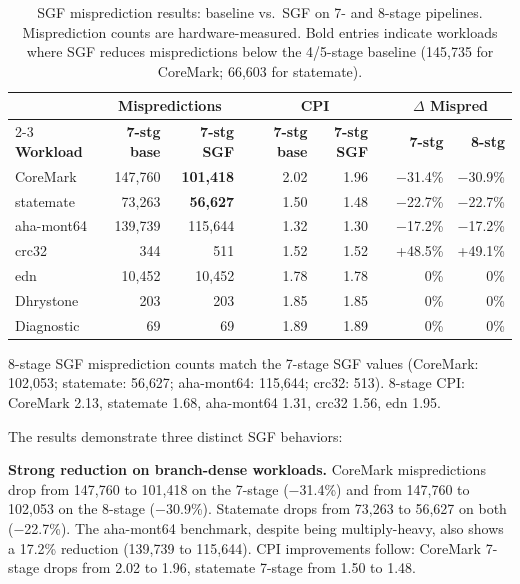 \documentclass[journal]{IEEEtran}
\begin{document}
\begin{table}[t]
\begin{table}[t]
\begin{table}[t]
\begin{table}[t]
\begin{table}[t]
\begin{table}[t]
\begin{table}[t]
\centering
\caption{SGF misprediction results: baseline vs.\ SGF on 7- and 8-stage pipelines. Misprediction counts are hardware-measured. Bold entries indicate workloads where SGF reduces mispredictions below the 4/5-stage baseline (145{,}735 for CoreMark; 66{,}603 for statemate).}
\label{tab:sgf_mispred}
\small
\begin{tabular}{@{}l rr c rr c rr@{}}
\toprule
& \multicolumn{2}{c}{\textbf{Mispredictions}} & & \multicolumn{2}{c}{\textbf{CPI}} & & \multicolumn{2}{c}{\textbf{$\Delta$ Mispred}} \\
\cmidrule{2-3} \cmidrule{5-6} \cmidrule{8-9}
\textbf{Workload} & \textbf{7-stg base} & \textbf{7-stg SGF} & & \textbf{7-stg base} & \textbf{7-stg SGF} & & \textbf{7-stg} & \textbf{8-stg} \\
\midrule
CoreMark     & 147{,}760 & \textbf{101{,}418} & & 2.02 & 1.96 & & $-$31.4\% & $-$30.9\% \\
statemate    & 73{,}263  & \textbf{56{,}627}  & & 1.50 & 1.48 & & $-$22.7\% & $-$22.7\% \\
aha-mont64   & 139{,}739 & 115{,}644          & & 1.32 & 1.30 & & $-$17.2\% & $-$17.2\% \\
crc32        & 344       & 511                & & 1.52 & 1.52 & & +48.5\%   & +49.1\% \\
edn          & 10{,}452  & 10{,}452           & & 1.78 & 1.78 & & 0\%       & 0\% \\
Dhrystone    & 203       & 203                & & 1.85 & 1.85 & & 0\%       & 0\% \\
Diagnostic   & 69        & 69                 & & 1.89 & 1.89 & & 0\%       & 0\% \\
\bottomrule
\end{tabular}

\vspace{4pt}
\footnotesize{8-stage SGF misprediction counts match the 7-stage SGF values (CoreMark: 102{,}053; statemate: 56{,}627; aha-mont64: 115{,}644; crc32: 513). 8-stage CPI: CoreMark 2.13, statemate 1.68, aha-mont64 1.31, crc32 1.56, edn 1.95.}
\end{table}

The results demonstrate three distinct SGF behaviors:

\textbf{Strong reduction on branch-dense workloads.} CoreMark mispredictions drop from 147{,}760 to 101{,}418 on the 7-stage ($-$31.4\%) and from 147{,}760 to 102{,}053 on the 8-stage ($-$30.9\%). Statemate drops from 73{,}263 to 56{,}627 on both ($-$22.7\%). The aha-mont64 benchmark, despite being multiply-heavy, also shows a 17.2\% reduction (139{,}739 to 115{,}644). CPI improvements follow: CoreMark 7-stage drops from 2.02 to 1.96, statemate 7-stage from 1.50 to 1.48.


\end{table}
\end{table}
\end{table}
\end{table}
\end{table}
\end{table}
\end{document}
